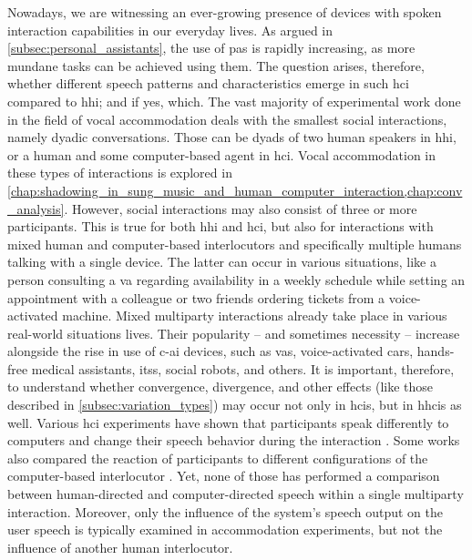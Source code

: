Nowadays, we are witnessing an ever-growing presence of devices with spoken interaction capabilities in our everyday lives.
As argued in \cref{subsec:personal_assistants}, the use of \acp{pa} is rapidly increasing, as more mundane tasks can be achieved using them.
The question arises, therefore, whether different speech patterns and characteristics emerge in such \ac{hci} compared to \ac{hhi}; and if yes, which.
The vast majority of experimental work done in the field of vocal accommodation deals with the smallest social interactions, namely dyadic conversations.
Those can be dyads of two human speakers in \ac{hhi}, or a human and some computer-based agent in \ac{hci}.
Vocal accommodation in these types of interactions is explored in \cref{chap:shadowing_in_sung_music_and_human_computer_interaction,chap:conv_analysis}.
However, social interactions may also consist of three or more participants.
This is true for both \ac{hhi} and \ac{hci}, but also for interactions with mixed human and computer-based interlocutors and specifically multiple humans talking with a single device.
The latter can occur in various situations, like a person consulting a \ac{va} regarding availability in a weekly schedule while setting an appointment with a colleague or two friends ordering tickets from a voice-activated machine.
Mixed multiparty interactions already take place in various real-world situations lives.
Their popularity -- and sometimes necessity -- increase alongside the rise in use of \ac{c-ai} devices, such as \acp{va}, voice-activated cars, hands-free medical assistants, \acp{its}, social robots, and others.
It is important, therefore, to understand whether convergence, divergence, and other effects (like those described in \cref{subsec:variation_types}) may occur not only in \acp{hci}, but in \acfp{hhci} as well.
Various \ac{hci} experiments have shown that participants speak differently to computers and change their speech behavior during the interaction \citep[e.g.,][]{Branigan2010linguistic}.
Some works also compared the reaction of participants to different configurations of the computer-based interlocutor \citep[e.g.,][]{Levitan2016implementing}.
Yet, none of those has performed a comparison between human-directed and computer-directed speech within a single multiparty interaction.
Moreover, only the influence of the system's speech output on the user speech is typically examined in accommodation experiments, but not the influence of another human interlocutor.

